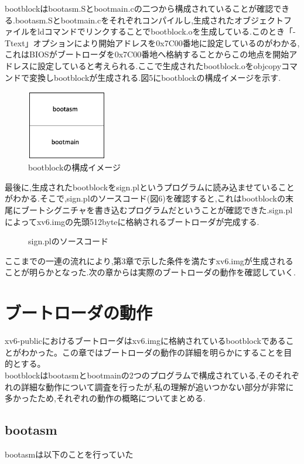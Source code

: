 \documentclass[submit,techreq,noauthor]{eco}	%
\begin{document}
bootblockはbootasm.Sとbootmain.cの二つから構成されていることが確認できる.bootasm.Sとbootmain.cをそれぞれコンパイルし,生成されたオブジェクトファイルをldコマンドでリンクすることでbootblock.oを生成している.このとき「-Ttext」オプションにより開始アドレスを0x7C00番地に設定しているのがわかる,これはBIOSがブートローダを0x7C00番地へ格納することからこの地点を開始アドレスに設定していると考えられる.ここで生成されたbootblock.oをobjcopyコマンドで変換しbootblockが生成される.図5にbootblockの構成イメージを示す.

\begin{figure}[H]
	\centering
	\includegraphics[width=3.5cm]{fig/pic4.eps}
	\caption{bootblockの構成イメージ}
	\label{sample}
\end{figure}

最後に,生成されたbootblockをsign.plというプログラムに読み込ませていることがわかる.そこで,sign.plのソースコード(図6)を確認すると,これはbootblockの末尾にブートシグニチャを書き込むプログラムだということが確認できた.sign.plによってxv6.imgの先頭512byteに格納されるブートローダが完成する.

\begin{figure}[H]
	\centering
	\caption{sign.plのソースコード}
	\label{sample}
\end{figure}

ここまでの一連の流れにより,第3章で示した条件を満たすxv6.imgが生成されることが明らかとなった.次の章からは実際のブートローダの動作を確認していく.

\section{ブートローダの動作}
xv6-publicにおけるブートローダはxv6.imgに格納されているbootblockであることがわかった。この章ではブートローダの動作の詳細を明らかにすることを目的とする。\\
bootblockはbootasmとbootmainの2つのプログラムで構成されている,そのそれぞれの詳細な動作について調査を行ったが,私の理解が追いつかない部分が非常に多かったため,それぞれの動作の概略についてまとめる.

\subsection{bootasm}
bootasmは以下のことを行っていた
\end{document}
